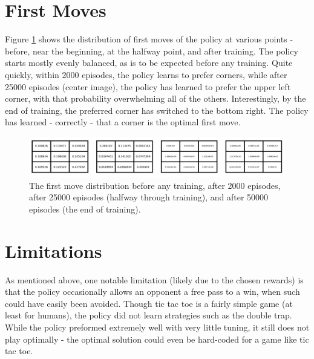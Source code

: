 \documentclass{article}
\begin{document}
   \section{First Moves}
   Figure \ref{fig:7} shows the distribution of first moves of the policy at various points - before, near the beginning,
   at the halfway point, and after training. The policy starts mostly evenly balanced, as is to be expected before
   any training. Quite quickly, within 2000 episodes, the policy learns to prefer corners, while after 25000 episodes
   (center image), the policy has learned to prefer the upper left corner, with
   that probability overwhelming all of the others. Interestingly, by the end of training, the preferred corner
   has switched to the bottom right. The policy has learned - correctly - that a corner is the optimal first move.
      \begin{figure}[h] \centering
          \includegraphics[width=6.5in]{resources/part7}
          \caption{ The first move distribution before any training, after 2000 episodes, after 25000 episodes (halfway
                  through training), and after 50000 episodes (the end of training). }
          \label{fig:7}
       \end{figure}


   \section{Limitations}
   As mentioned above, one notable limitation (likely due to the chosen rewards) is that the policy occasionally allows
   an opponent a free pass to a win, when such could have easily been avoided. Though tic tac toe is a fairly simple
   game (at least for humans), the policy did not learn strategies such as the double trap. While the policy preformed
   extremely well with very little tuning, it still does not play optimally - the optimal solution could even be
   hard-coded for a game like tic tac toe.
\end{document}
